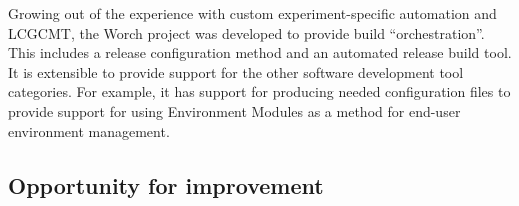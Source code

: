 Growing out of the experience with custom experiment-specific
automation and LCGCMT, the Worch project was developed to provide
build ``orchestration''.  This includes a release configuration method
and an automated release build tool.  It is extensible to provide
support for the other software development tool categories.  For
example, it has support for producing needed configuration files to
provide support for using Environment Modules as a method for end-user
environment management.


\subsection{Opportunity for improvement}

